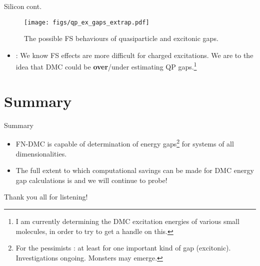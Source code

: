 \documentclass[12pt, pdf, hyperref={draft}, usenames, dvipsnames]{beamer}
\newcommand{\gitem}[1]{\setbeamercolor{item}{fg=ForestGreen}\item[$\checkmark$] #1}
\newcommand{\bitem}[1]{\setbeamercolor{item}{fg=LancsRed}\item[$\times$] #1}
\newcommand{\red}[1]{{\bf\color{LancsRed}{#1}}}
\newcommand{\blue}[1]{{\bf\color{NavyBlue}{#1}}}
\newcommand{\green}[1]{{\bf\color{ForestGreen}{#1}}}
\begin{document}
\begin{frame}{Silicon cont.}
  \begin{figure}[H]
    \centering
    \texttt{[image: figs/qp\_ex\_gaps\_extrap.pdf]}
    \caption{The possible FS behaviours of quasiparticle and excitonic gaps.}
    \label{fig:}
  \end{figure}

\begin{itemize}
  \item \blue{Take-home point} : We know FS effects are more difficult for
  charged excitations. We are \green{open} to the idea that DMC could be
  {\bf over}/{\color{gray}under} estimating QP gaps.\footnote{I am currently
  determining the DMC excitation energies of various small molecules, in order
  to try to get a handle on this.}

\end{itemize}
\end{frame}



\section*{Summary}

\begin{frame}{Summary}
  \begin{itemize}
  \item FN-DMC is capable of \blue{predictive} determination of
  energy gaps\footnote{For the pessimists : at least for one important kind of
  gap (excitonic). Investigations ongoing. Monsters may emerge.} for \green{diversely bonded} systems of all
  dimensionalities.
  \vspace{1cm}
  \item The full extent to which computational savings can be made for DMC
  energy gap calculations is \blue{unclear} and we will continue to probe!
  \end{itemize}

\end{frame}


\begin{frame}[plain]
\begin{center}
  {\Huge Thank you all for listening!} \\
\end{center}
\end{frame}
\end{document}
